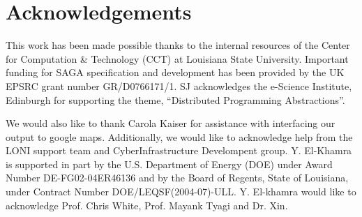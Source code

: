 \documentclass[conference,final]{IEEEtran}
\begin{document}






\section{Acknowledgements}

This work has been made possible thanks to the internal resources of
the Center for Computation \& Technology (CCT) at Louisiana State
University.  Important funding for SAGA specification and development
has been provided by the UK EPSRC grant number GR/D0766171/1.  SJ
acknowledges the e-Science Institute, Edinburgh for supporting the
theme, ``Distributed Programming Abstractions''.  

We would also like to thank Carola Kaiser for assistance with
interfacing our output to google maps. Additionally, we would like to
acknowledge help from the LONI support team and CyberInfrastructure
Develompent group.  Y. El-Khamra is supported in part by the U.S.
Department of Energy (DOE) under Award Number DE-FG02-04ER46136 and by
the Board of Regents, State of Louisiana, under Contract Number
DOE/LEQSF(2004-07)-ULL.  Y.  El-khamra would like to acknowledge Prof.
Chris White, Prof. Mayank Tyagi and Dr. Xin.



\end{document}

